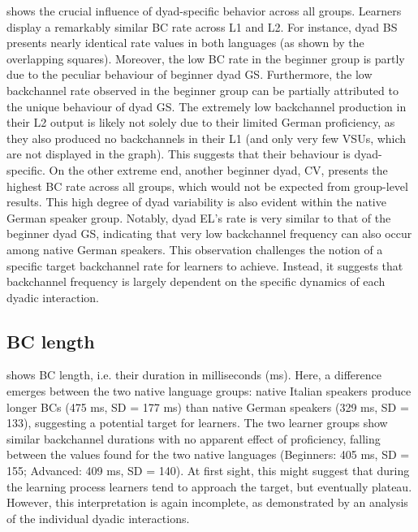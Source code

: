  shows the crucial influence of dyad-specific behavior across all groups. Learners display a remarkably similar BC rate across L1 and L2. For instance, dyad BS presents nearly identical rate values in both languages (as shown by the overlapping squares). Moreover, the low BC rate in the beginner group is partly due to the peculiar behaviour of beginner dyad GS. Furthermore, the low backchannel rate observed in the beginner group can be partially attributed to the unique behaviour of dyad GS. The extremely low backchannel production in their L2 output is likely not solely due to their limited German proficiency, as they also produced no backchannels in their L1 (and only very few VSUs, which are not displayed in the graph). This suggests that their behaviour is dyad-specific. On the other extreme end, another beginner dyad, CV, presents the highest BC rate across all groups, which would not be expected from group-level results. This high degree of dyad variability is also evident within the native German speaker group. Notably, dyad EL's rate is very similar to that of the beginner dyad GS, indicating that very low backchannel frequency can also occur among native German speakers. This observation challenges the notion of a specific target backchannel rate for learners to achieve. Instead, it suggests that backchannel frequency is largely dependent on the specific dynamics of each dyadic interaction.


\subsection{BC length}
\label{sec:4.3.2}

 shows BC length, i.e. their duration in milliseconds (ms). Here, a difference emerges between the two native language groups: native Italian speakers produce longer BCs (475 ms, SD = 177 ms) than native German speakers (329 ms, SD = 133), suggesting a potential target for learners. The two learner groups show similar backchannel durations with no apparent effect of proficiency, falling between the values found for the two native languages (Beginners: 405 ms, SD = 155; Advanced: 409 ms, SD = 140). At first sight, this might suggest that during the learning process learners tend to approach the target, but eventually plateau. However, this interpretation is again incomplete, as demonstrated by an analysis of the individual dyadic interactions.


